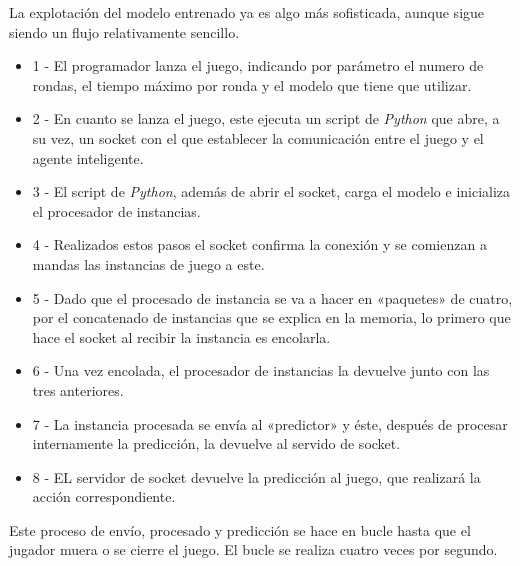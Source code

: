 La explotación del modelo entrenado ya es algo más sofisticada, aunque sigue siendo un flujo relativamente sencillo.
\begin{itemize}
    \item 1 - El programador lanza el juego, indicando por parámetro el numero de rondas, el tiempo máximo por ronda y el modelo que tiene que utilizar.
    \item 2 - En cuanto se lanza el juego, este ejecuta un script de \emph{Python} que abre, a su vez, un socket con el que establecer la comunicación entre el juego y el agente inteligente.
    \item 3 - El script de \emph{Python}, además de abrir el socket, carga el modelo e inicializa el procesador de instancias.
    \item 4 - Realizados estos pasos el socket confirma la conexión y se comienzan a mandas las instancias de juego a este.
    \item 5 - Dado que el procesado de instancia se va a hacer en «paquetes» de cuatro, por el concatenado de instancias que se explica en la memoria, lo primero que hace el socket al recibir la instancia es encolarla.
    \item 6 - Una vez encolada, el procesador de instancias la devuelve junto con las tres anteriores.
    \item 7 - La instancia procesada se envía al «predictor» y éste, después de procesar internamente la predicción, la devuelve al servido de socket.
    \item 8 - EL servidor de socket devuelve la predicción al juego, que realizará la acción correspondiente.
\end{itemize}

Este proceso de envío, procesado y predicción se hace en bucle hasta que el jugador muera o se cierre el juego. El bucle se realiza cuatro veces por segundo.